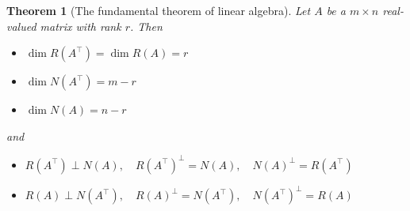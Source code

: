 \documentclass[]{article}
\theoremstyle{plain}
\newtheorem{thm}{Theorem}
\theoremstyle{definition}
\theoremstyle{remark}
\begin{document}
\begin{thm}[The fundamental theorem of linear algebra]
Let $A$ be a $m \times n$ real-valued matrix with rank $r$.  Then
\begin{itemize}
\item $\dim R(A^\top) = \dim R(A) = r$
\item $\dim N(A^\top) = m - r$
\item $\dim N(A) = n - r$
\end{itemize}
and
\begin{itemize}
\item $R(A^\top) \perp N(A), \quad R(A^\top)^\perp = N(A), \quad N(A)^\perp = R(A^\top)$
\item $R(A) \perp N(A^\top), \quad R(A)^\perp = N(A^\top), \quad N(A^\top)^\perp = R(A)$
\end{itemize}
\end{thm}
\end{document}

